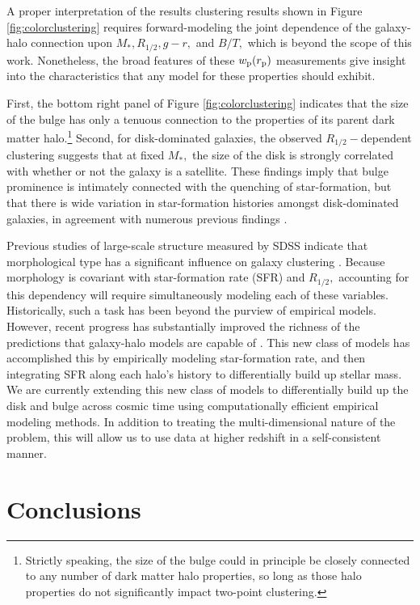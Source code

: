 \documentclass[usenatbib,usegraphicx,letterpaper]{mn2e}
\newcommand{\rhalf}{R_{1/2}}
\newcommand{\mstar}{M_{\ast}}
\newcommand{\rproj}{r_{\rm p}}
\newcommand{\wproj}{w_{\rm p}}
\begin{document}
A proper interpretation of the results clustering results shown in Figure \ref{fig:colorclustering} requires forward-modeling the joint dependence of the galaxy-halo connection upon $\mstar, \rhalf, g-r, $ and $B/T,$ which is beyond the scope of this work. Nonetheless, the broad features of these $\wproj(\rproj)$ measurements give insight into the characteristics that any model for these properties should exhibit.

First, the bottom right panel of Figure \ref{fig:colorclustering} indicates that the size of the bulge has only a tenuous connection to the properties of its parent dark matter halo.\footnote{Strictly speaking, the size of the bulge could in principle be closely connected to any number of dark matter halo properties, so long as those halo properties do not significantly impact two-point clustering.} Second, for disk-dominated galaxies, the observed $\rhalf-$dependent clustering suggests that at fixed $\mstar,$ the size of the disk is strongly correlated with whether or not the galaxy is a satellite. These findings imply that bulge prominence is intimately connected with the quenching of star-formation, but that there is wide variation in star-formation histories amongst disk-dominated galaxies, in agreement with numerous previous findings \citep[see, e.g.,][]{woo_etal15,font_etal17}.

Previous studies of large-scale structure measured by SDSS indicate that morphological type has a significant influence on galaxy clustering \citep{skibba_etal08}. Because morphology is covariant with star-formation rate (SFR) and $\rhalf,$ accounting for this dependency will require simultaneously modeling each of these variables. Historically, such a task has been beyond the purview of empirical models. However, recent progress has substantially improved the richness of the predictions that galaxy-halo models are capable of \citep{becker15,cohn17,moster_etal17}. This new class of models has accomplished this by empirically modeling star-formation rate, and then integrating SFR along each halo's history to differentially build up stellar mass. We are currently extending this new class of models to differentially build up the disk and bulge across cosmic time using computationally efficient empirical modeling methods. In addition to treating the multi-dimensional nature of the problem, this will allow us to use data at higher redshift in a self-consistent manner.

\section{Conclusions}
\label{sec:conclusion}
\end{document}
